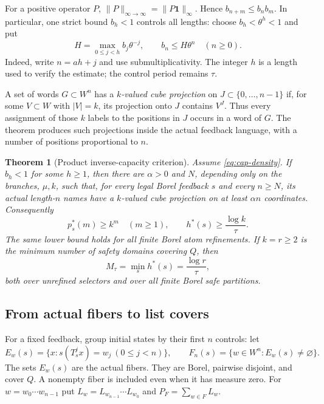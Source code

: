 \documentclass[11pt,reqno]{amsart}
\numberwithin{equation}{section}
\newtheorem{theorem}{Theorem}[section]
\theoremstyle{definition}
\theoremstyle{definition}
\newcommand{\one}{\mathbf 1}
\begin{document}
For a positive operator $P$, $\|P\|_{\infty\to\infty}
=\|P\one\|_\infty$. Hence $b_{n+m}\le b_nb_m$. In particular,
one strict bound $b_h<1$ controls all lengths: choose
$b_h<\theta^h<1$ and put
\begin{equation}\label{eq:cap-exp}
 H=\max_{0\le j<h}b_j\theta^{-j},\qquad
 b_n\le H\theta^n\quad(n\ge0).
\end{equation}
Indeed, write $n=ah+j$ and use submultiplicativity. The integer
$h$ is a length used to verify the estimate; the control period
remains $\tau$.

A set of words $G\subset W^n$ has a \emph{$k$-valued cube projection}
on $J\subset\{0,\ldots,n-1\}$ if, for some $V\subset W$ with
$|V|=k$, its projection onto $J$ contains $V^J$. Thus every assignment
of those $k$ labels to the positions in $J$ occurs in a word of $G$.
The theorem produces such projections inside the actual feedback
language, with a number of positions proportional to $n$.


\begin{theorem}[Product inverse-capacity criterion]\label{thm:capacity-main}
Assume \eqref{eq:cap-density}. If $b_h<1$ for some $h\ge1$, then
there are $\alpha>0$ and $N$, depending only on the branches,
$\mu,k$, such that, for every legal Borel feedback $s$ and every
$n\ge N$, its actual length-$n$ names have a $k$-valued cube
projection on at least $\alpha n$ coordinates. Consequently
\begin{equation}\label{eq:cap-pattern}
 p_s^*(m)\ge k^m\quad(m\ge1),\qquad
 h^*(s)\ge\frac{\log k}{\tau}.
\end{equation}
The same lower bound holds for all finite Borel atom refinements.
If $k=r\ge2$ is the minimum number of safety domains covering $Q$,
then
\begin{equation}\label{eq:cap-M}
 M_\tau=\min_s h^*(s)=\frac{\log r}{\tau},
\end{equation}
both over unrefined selectors and over all finite Borel safe partitions.
\end{theorem}

\subsection{From actual fibers to list covers}
For a fixed feedback, group initial states by their first $n$ controls:
let
\[
 E_w(s)=\{x:s(T_s^jx)=w_j\ (0\le j<n)\},\qquad
 F_n(s)=\{w\in W^n:E_w(s)\ne\varnothing\}.
\]
The sets $E_w(s)$ are the actual fibers. They are Borel, pairwise
disjoint, and cover $Q$. A nonempty fiber is included even when it
has measure zero.
For $w=w_0\cdots w_{n-1}$ put
$L_w=L_{w_{n-1}}\cdots L_{w_0}$ and
$P_F=\sum_{w\in F}L_w$.
\end{document}
